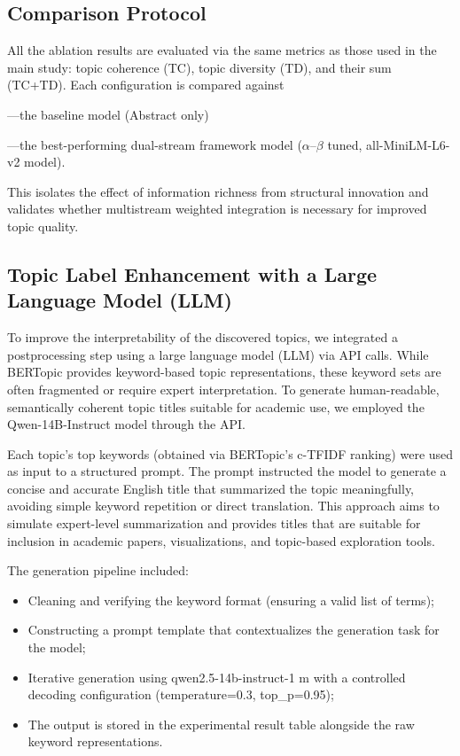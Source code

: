 \documentclass{ieeeaccess}
\begin{document}
\subsection{Comparison Protocol}
All the ablation results are evaluated via the same metrics as those used in the main study: topic coherence (TC), topic diversity (TD), and their sum (TC+TD). Each configuration is compared against 

---the baseline model (Abstract only)

---the best-performing dual-stream framework model ($\alpha$--$\beta$ tuned, all-MiniLM-L6-v2 model).

This isolates the effect of information richness from structural innovation and validates whether multistream weighted integration is necessary for improved topic quality.

\subsection{Topic Label Enhancement with a Large Language Model (LLM)}

To improve the interpretability of the discovered topics, we integrated a postprocessing step using a large language model (LLM) via API calls. While BERTopic provides keyword-based topic representations, these keyword sets are often fragmented or require expert interpretation. To generate human-readable, semantically coherent topic titles suitable for academic use, we employed the Qwen-14B-Instruct model through the API.

Each topic's top keywords (obtained via BERTopic's c-TFIDF ranking) were used as input to a structured prompt. The prompt instructed the model to generate a concise and accurate English title that summarized the topic meaningfully, avoiding simple keyword repetition or direct translation. This approach aims to simulate expert-level summarization and provides titles that are suitable for inclusion in academic papers, visualizations, and topic-based exploration tools.

The generation pipeline included:

\begin{itemize}
    \item Cleaning and verifying the keyword format (ensuring a valid list of terms);
    \item Constructing a prompt template that contextualizes the generation task for the model;
    \item Iterative generation using qwen2.5-14b-instruct-1 m with a controlled decoding configuration (temperature=0.3, top\_p=0.95);
    \item The output is stored in the experimental result table alongside the raw keyword representations.
\end{itemize}
\end{document}
